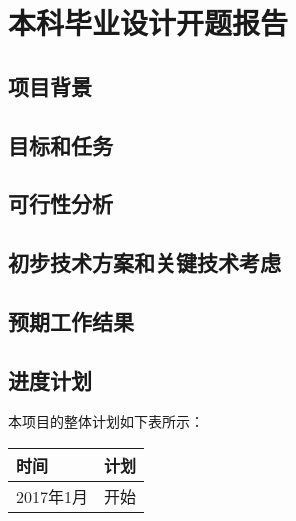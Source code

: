 \thispagestyle{empty}
{
\chapter{本科毕业设计开题报告}

\section{项目背景}

\section{目标和任务}

\section{可行性分析}

\section{初步技术方案和关键技术考虑}

\section{预期工作结果}

\section{进度计划}

本项目的整体计划如下表所示：

\begin{tabular}{|l|l|}
\hline
时间 & 计划 \\ \hline
2017年1月 & 开始 \\ \hline
\end{tabular}
}
